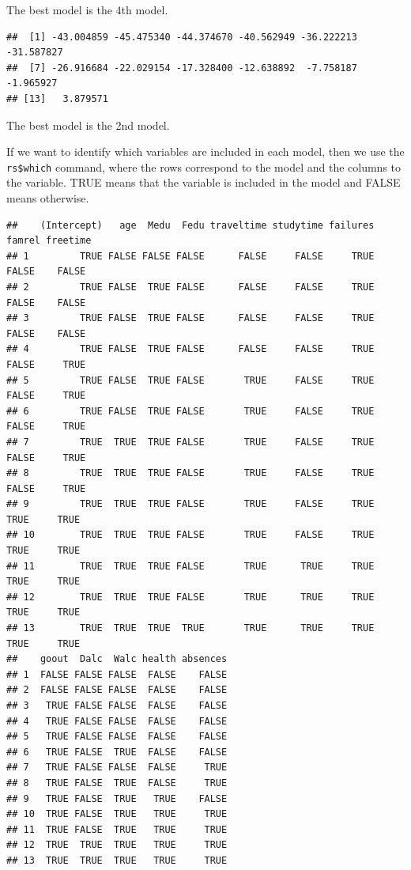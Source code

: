 \documentclass[
]{book}
\newenvironment{Shaded}{\begin{snugshade}}{\end{snugshade}}
\newcommand{\DocumentationTok}[1]{\textcolor[rgb]{0.56,0.35,0.01}{\textbf{\textit{#1}}}}
\newcommand{\NormalTok}[1]{#1}
\newcommand{\SpecialCharTok}[1]{\textcolor[rgb]{0.81,0.36,0.00}{\textbf{#1}}}
\begin{document}
The best model is the 4th model.

\begin{Shaded}
\end{Shaded}

\begin{verbatim}
##  [1] -43.004859 -45.475340 -44.374670 -40.562949 -36.222213 -31.587827
##  [7] -26.916684 -22.029154 -17.328400 -12.638892  -7.758187  -1.965927
## [13]   3.879571
\end{verbatim}

The best model is the 2nd model.

If we want to identify which variables are included in each model, then we use the \texttt{rs\$which} command, where the rows correspond to the model and the columns to the variable. TRUE means that the variable is included in the model and FALSE means otherwise.

\begin{Shaded}
\end{Shaded}

\begin{verbatim}
##    (Intercept)   age  Medu  Fedu traveltime studytime failures famrel freetime
## 1         TRUE FALSE FALSE FALSE      FALSE     FALSE     TRUE  FALSE    FALSE
## 2         TRUE FALSE  TRUE FALSE      FALSE     FALSE     TRUE  FALSE    FALSE
## 3         TRUE FALSE  TRUE FALSE      FALSE     FALSE     TRUE  FALSE    FALSE
## 4         TRUE FALSE  TRUE FALSE      FALSE     FALSE     TRUE  FALSE     TRUE
## 5         TRUE FALSE  TRUE FALSE       TRUE     FALSE     TRUE  FALSE     TRUE
## 6         TRUE FALSE  TRUE FALSE       TRUE     FALSE     TRUE  FALSE     TRUE
## 7         TRUE  TRUE  TRUE FALSE       TRUE     FALSE     TRUE  FALSE     TRUE
## 8         TRUE  TRUE  TRUE FALSE       TRUE     FALSE     TRUE  FALSE     TRUE
## 9         TRUE  TRUE  TRUE FALSE       TRUE     FALSE     TRUE   TRUE     TRUE
## 10        TRUE  TRUE  TRUE FALSE       TRUE     FALSE     TRUE   TRUE     TRUE
## 11        TRUE  TRUE  TRUE FALSE       TRUE      TRUE     TRUE   TRUE     TRUE
## 12        TRUE  TRUE  TRUE FALSE       TRUE      TRUE     TRUE   TRUE     TRUE
## 13        TRUE  TRUE  TRUE  TRUE       TRUE      TRUE     TRUE   TRUE     TRUE
##    goout  Dalc  Walc health absences
## 1  FALSE FALSE FALSE  FALSE    FALSE
## 2  FALSE FALSE FALSE  FALSE    FALSE
## 3   TRUE FALSE FALSE  FALSE    FALSE
## 4   TRUE FALSE FALSE  FALSE    FALSE
## 5   TRUE FALSE FALSE  FALSE    FALSE
## 6   TRUE FALSE  TRUE  FALSE    FALSE
## 7   TRUE FALSE FALSE  FALSE     TRUE
## 8   TRUE FALSE  TRUE  FALSE     TRUE
## 9   TRUE FALSE  TRUE   TRUE    FALSE
## 10  TRUE FALSE  TRUE   TRUE     TRUE
## 11  TRUE FALSE  TRUE   TRUE     TRUE
## 12  TRUE  TRUE  TRUE   TRUE     TRUE
## 13  TRUE  TRUE  TRUE   TRUE     TRUE
\end{verbatim}
\end{document}
